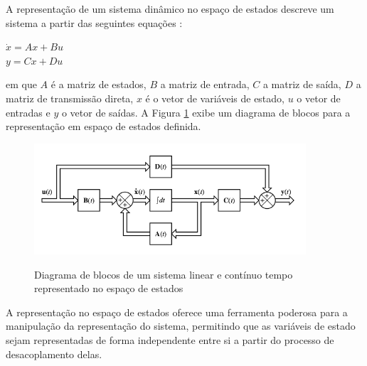 A representação de um sistema dinâmico no espaço de estados descreve um sistema a partir das seguintes equações :
\begin{center}\label{eq:k1}
$\dot{x}=Ax+Bu$ \\
$y=Cx+Du$
\end{center}
em que $A$ é a matriz de estados, $B$ a matriz de entrada, $C$ a matriz de saída, $D$ a matriz de transmissão direta, $x$ é o vetor de variáveis de estado, $u$ o vetor de entradas e $y$ o vetor de saídas. A Figura \ref{fig:ss_diagram} exibe um diagrama de blocos para a representação em espaço de estados definida.

\begin{figure}[!htb]
    \centering
    \caption{Diagrama de blocos de um sistema linear e contínuo tempo representado no espaço de estados}
    \includegraphics[width=0.9\textwidth]{./04-figuras/fund_teorica/ss_diagram}
    \label{fig:ss_diagram}
\end{figure}

A representação no espaço de estados oferece uma ferramenta poderosa para a manipulação da representação do sistema, permitindo que as variáveis de estado sejam representadas de forma independente entre si a partir do processo de desacoplamento delas.


